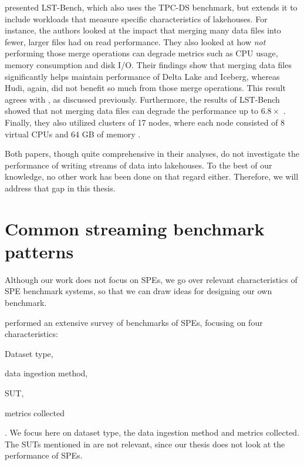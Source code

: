 \citeauthor{camacho-rodriguezLSTBenchBenchmarkingLogStructured2024} \cite{camacho-rodriguezLSTBenchBenchmarkingLogStructured2024} presented LST-Bench, which also uses the TPC-DS benchmark, but extends it to include workloads that measure specific characteristics of lakehouses. For instance, the authors looked at the impact that merging many data files into fewer, larger files had on read performance. They also looked at how \textit{not} performing those merge operations can degrade metrics such as CPU usage, memory consumption and disk I/O. Their findings show that merging data files significantly helps maintain performance of Delta Lake and Iceberg, whereas Hudi, again, did not benefit so much from those merge operations. This result agrees with \cite{paras_jain_analyzing_2023}, as discussed previously. Furthermore, the results of LST-Bench showed that not merging data files can degrade the performance up to $6.8\times$ \cite{camacho-rodriguezLSTBenchBenchmarkingLogStructured2024}. Finally, they also utilized clusters of 17 nodes, where each node consisted of 8 virtual CPUs and 64 GB of memory \cite{camacho-rodriguezLSTBenchBenchmarkingLogStructured2024}.

Both papers, though quite comprehensive in their analyses, do not investigate the performance of writing streams of data into lakehouses. To the best of our knowledge, no other work has been done on that regard either. Therefore, we will address that gap in this thesis.

\section{Common streaming benchmark patterns}
Although our work does not focus on SPEs, we go over relevant characteristics of SPE benchmark systems, so that we can draw ideas for designing our own benchmark. 

\citeauthor{yueSurveyStreamProcessing2025} \cite{yueSurveyStreamProcessing2025} performed an extensive survey of benchmarks of SPEs, focusing on four characteristics: \begin{enumerate*}[label*=(\roman*)]
	\item Dataset type,
	\item data ingestion method,
	\item SUT,
	\item metrics collected
\end{enumerate*}. We focus here on dataset type, the data ingestion method and metrics collected. The SUTs mentioned in \cite{yueSurveyStreamProcessing2025} are not relevant, since our thesis does not look at the performance of SPEs.

